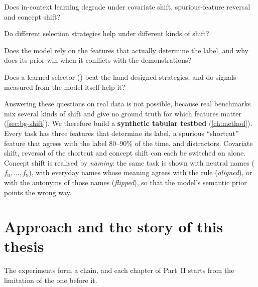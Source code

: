 \begin{description}[leftmargin=2.4em, style=nextline]
  \item[\RQ1] Does in-context learning degrade under covariate shift, spurious-feature reversal and concept shift?
  \item[\RQ2] Do different selection strategies help under different kinds of shift?
  \item[\RQ3] Does the model rely on the features that actually determine the label, and why does its prior win when it conflicts with the demonstrations?
  \item[\RQ4] Does a learned selector (\sata) beat the hand-designed strategies, and do signals measured from the model itself help it?
\end{description}

Answering these questions on real data is not possible, because real benchmarks mix several kinds of shift and give no ground truth for which features matter (\autoref{sec:bg-shift}).
We therefore build a \textbf{synthetic tabular testbed} (\autoref{ch:method}).
Every task has three features that determine its label, a spurious ``shortcut'' feature that agrees with the label 80--90\% of the time, and distractors.
Covariate shift, reversal of the shortcut and concept shift can each be switched on alone.
Concept shift is realised by \emph{naming}: the same task is shown with neutral names ($f_0, \ldots, f_9$), with everyday names whose meaning agrees with the rule (\emph{aligned}), or with the antonyms of those names (\emph{flipped}), so that the model's semantic prior points the wrong way.

\section{Approach and the story of this thesis}

The experiments form a chain, and each chapter of Part~II starts from the limitation of the one before it.

